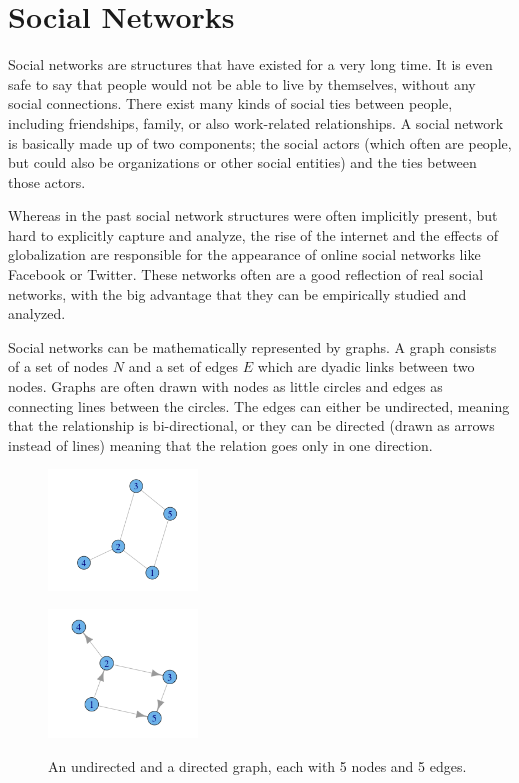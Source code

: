 \section{Social Networks}
\label{s:socialnetworks} Social networks are structures that have existed for a very long time. It is even safe to say that people would not be able to live by themselves, without any social connections. There exist many kinds of social ties between people, including friendships, family, or also work-related relationships. A social network is basically made up of two components; the social actors (which often are people, but could also be organizations or other social entities) and the ties between those actors.

Whereas in the past social network structures were often implicitly present, but hard to explicitly capture and analyze, the rise of the internet and the effects of globalization are responsible for the appearance of online social networks like Facebook or Twitter. These networks often are a good reflection of real social networks, with the big advantage that they can be empirically studied and analyzed.

Social networks can be mathematically represented by graphs. A graph consists of a set of nodes $N$ and a set of edges $E$ which are dyadic links between two nodes. Graphs are often drawn with nodes as little circles and edges as connecting lines between the circles. The edges can either be undirected, meaning that the relationship is bi-directional, or they can be directed (drawn as arrows instead of lines) meaning that the relation goes only in one direction.

\begin{figure}[!ht]
\centering
\begin{minipage}[b]{5 cm}
\includegraphics[width=150px]{./2-recommendersystemssocialnetworks/figures/SampleGraph.png}
\label{f:simplegraph}
\end{minipage}
\begin{minipage}[b]{5 cm}
\includegraphics[width=150px]{./2-recommendersystemssocialnetworks/figures/SampleGraph2.png}
\label{f:simplegraph}
\end{minipage}
\caption[An undirected and a directed graph, each with 5 nodes and 5 edges.]
{An undirected and a directed graph, each with 5 nodes and 5 edges.}
\end{figure}

